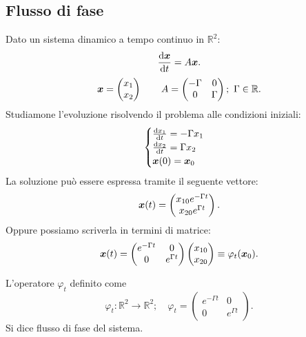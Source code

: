 \subsection{Flusso di fase}%
\label{sub:Flusso di fase}
Dato un sistema dinamico a tempo continuo in $\mathbb{R}^2$:
\[
    \frac{\text{d} \boldsymbol{x}}{\text{d} t} = A\boldsymbol{x}
.\] 
\[
    \boldsymbol{x} = \begin{pmatrix} x_1 \\ x_2 \end{pmatrix}  \qquad A = \begin{pmatrix} - \Gamma  & 0 \\ 0 & \Gamma \end{pmatrix}; \ \Gamma  \in \mathbb{R}
.\] 
Studiamone l'evoluzione risolvendo il problema alle condizioni iniziali:
\[
    \begin{cases}
        \frac{\text{d} x_1}{\text{d} t} = -\Gamma  x_1\\
	\frac{\text{d} x_2}{\text{d} t} = \Gamma x_2\\
	\boldsymbol{x} (0)=\boldsymbol{x}_0
    \end{cases}
\] 
La soluzione può essere espressa tramite il seguente vettore:
\[
    \boldsymbol{x} (t)= 
    \begin{pmatrix}  
	x_{10}e^{-\Gamma t}\\
	x_{20}e^{\Gamma t}
    \end{pmatrix} 
.\] 
Oppure possiamo scriverla in termini di matrice:
\[
    \boldsymbol{x} (t)=
    \begin{pmatrix} 
    e^{-\Gamma t} & 0 \\
    0 & e^{\Gamma t}
    \end{pmatrix} 
    \begin{pmatrix} 
	x_{10}\\
	x_{20}
    \end{pmatrix} 
    \equiv \varphi_t (\boldsymbol{x}_0)
.\] 
\begin{defn}
    L'operatore $\varphi_t$ definito come
    \[
        \varphi_t: \mathbb{R}^2 \to \mathbb{R}^2; \quad 
	\varphi_t = 
	\begin{pmatrix} 
	    e^{-\Gamma t} & 0 \\
	    0 & e^{\Gamma t} 
        \end{pmatrix} 
    .\] 
    Si dice flusso di fase del sistema.
\end{defn}
\noindent
